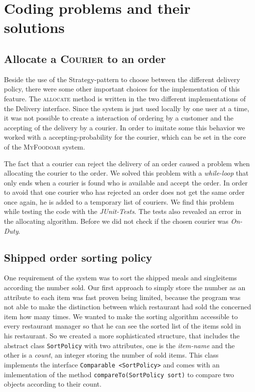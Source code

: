 \section{Coding problems and their solutions}
\label{sec:coding_problems_and_their_solutions}

\subsection{Allocate a \textsc{Courier} to an order}
\label{sub:allocate_a_courier_to_an_order}

Beside the use of the Strategy-pattern to choose between the different delivery policy, there were
some other important choices for the implementation of this feature. The \textsc{allocate} method 
is written in the two different implementations of the Delivery interface. Since the system is 
just used locally by one user at a time, it was not possible to create a interaction of ordering
by a customer and the accepting of the delivery by a courier. In order to imitate some this 
behavior we worked with a accepting-probability for the courier, which can be set in the core of
the \textsc{MyFoodoar} system. 

The fact that a courier can reject the delivery of an order caused a problem when allocating the 
courier to the order. We solved this problem with a \textit{while-loop} that only ends when
a courier is found who is available and accept the order. In order to avoid that one courier who
has rejected an order does not get the same order once again, he is added to a temporary list of
couriers. We find this problem while testing the code with the \textit{JUnit-Tests}. The tests 
also revealed an error in the allocating algorithm. Before we did not check if the chosen 
courier was \textit{On-Duty}.

 

\subsection{Shipped order sorting policy}
\label{sub:shipped_order_sorting_policy}

One requirement of the system was to sort the shipped meals and singleitems according the 
number sold. Our first approach to simply store the number as an attribute to each item
was fast proven being limited, because the program was not able to make the distinction
between which restaurant had sold the concerned item how many times. We wanted to 
make the sorting algorithm accessible to every restaurant manager so that he can see  the 
sorted list of the items sold in his restaurant. So we created a more sophisticated 
structure, that includes the abstract class \lstinline|SortPolicy| with two attributes,
one is the \textit{item-name} and the other is a \textit{count}, an integer storing the number
of sold items.
This class implements the interface \lstinline|Comparable <SortPolicy>| and comes with 
an imlementation of the method \lstinline|compareTo(SortPolicy sort)| to compare two
objects according to their count.

